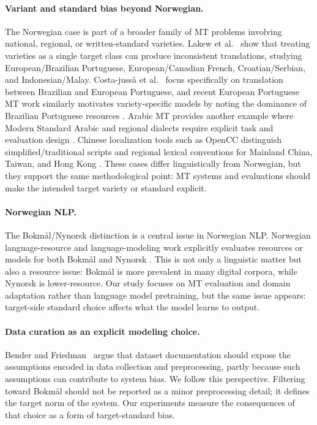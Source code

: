 \documentclass[11pt]{article}
\newcommand{\nb}{Bokm{\aa}l}
\newcommand{\nn}{Nynorsk}
\begin{document}
\paragraph{Variant and standard bias beyond Norwegian.}
The Norwegian case is part of a broader family of MT problems involving national, regional, or written-standard varieties. Lakew et al.~ show that treating varieties as a single target class can produce inconsistent translations, studying European/Brazilian Portuguese, European/Canadian French, Croatian/Serbian, and Indonesian/Malay. Costa-juss{\`a} et al.~ focus specifically on translation between Brazilian and European Portuguese, and recent European Portuguese MT work similarly motivates variety-specific models by noting the dominance of Brazilian Portuguese resources \cite{sousa-etal-2025-tradutor}. Arabic MT provides another example where Modern Standard Arabic and regional dialects require explicit task and evaluation design \cite{nacar-etal-2024-asos,mousi-etal-2025-aradice}. Chinese localization tools such as OpenCC distinguish simplified/traditional scripts and regional lexical conventions for Mainland China, Taiwan, and Hong Kong \cite{opencc}. These cases differ linguistically from Norwegian, but they support the same methodological point: MT systems and evaluations should make the intended target variety or standard explicit.

\paragraph{Norwegian NLP.}
The \nb{}/\nn{} distinction is a central issue in Norwegian NLP. Norwegian language-resource and language-modeling work explicitly evaluates resources or models for both \nb{} and \nn{} \cite{kummervold2021large,kummervold-etal-2022-norwegian,samuel-etal-2025-small}. This is not only a linguistic matter but also a resource issue: \nb{} is more prevalent in many digital corpora, while \nn{} is lower-resource. Our study focuses on MT evaluation and domain adaptation rather than language model pretraining, but the same issue appears: target-side standard choice affects what the model learns to output.

\paragraph{Data curation as an explicit modeling choice.}
Bender and Friedman~ argue that dataset documentation should expose the assumptions encoded in data collection and preprocessing, partly because such assumptions can contribute to system bias. We follow this perspective. Filtering toward \nb{} should not be reported as a minor preprocessing detail; it defines the target norm of the system. Our experiments measure the consequences of that choice as a form of target-standard bias.
\end{document}
